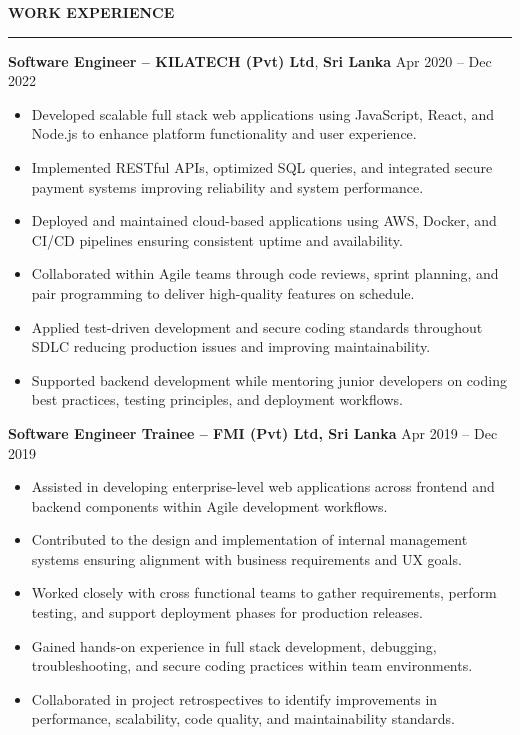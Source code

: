 \documentclass[10pt,letterpaper]{article}
\begin{document}
\vspace{8pt}

\textbf{WORK EXPERIENCE}\\[-8pt]
\noindent\rule{\textwidth}{1pt}

\vspace{-2pt}

\textbf{Software Engineer -- KILATECH (Pvt) Ltd}, \textbf{Sri Lanka} \hfill Apr 2020 -- Dec 2022

\vspace{-1pt}

\begin{itemize}
\item Developed scalable full stack web applications using JavaScript, React, and Node.js to enhance platform functionality and user experience.
\item Implemented RESTful APIs, optimized SQL queries, and integrated secure payment systems improving reliability and system performance.
\item Deployed and maintained cloud-based applications using AWS, Docker, and CI/CD pipelines ensuring consistent uptime and availability.
\item Collaborated within Agile teams through code reviews, sprint planning, and pair programming to deliver high-quality features on schedule.
\item Applied test-driven development and secure coding standards throughout SDLC reducing production issues and improving maintainability.
\item Supported backend development while mentoring junior developers on coding best practices, testing principles, and deployment workflows.
\end{itemize}

\textbf{Software Engineer Trainee -- FMI (Pvt) Ltd, Sri Lanka} \hfill Apr 2019 -- Dec 2019

\vspace{-1pt}

\begin{itemize}
\item Assisted in developing enterprise-level web applications across frontend and backend components within Agile development workflows.
\item Contributed to the design and implementation of internal management systems ensuring alignment with business requirements and UX goals.
\item Worked closely with cross functional teams to gather requirements, perform testing, and support deployment phases for production releases.
\item Gained hands-on experience in full stack development, debugging, troubleshooting, and secure coding practices within team environments.
\item Collaborated in project retrospectives to identify improvements in performance, scalability, code quality, and maintainability standards.
\end{itemize}
\end{document}
